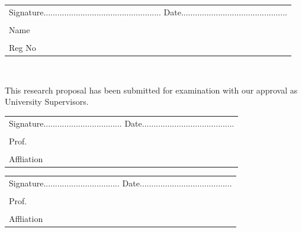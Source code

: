 \documentclass[12pt]{report}
\numberwithin{equation}{section}
\begin{document}
		\vspace{1cm}
		
		\indent %
		\begin{tabular}{l}
			Signature...................................................  Date..............................................\tabularnewline \\
			Name   \tabularnewline \\
			
			Reg No \tabularnewline
		\end{tabular}\\
		\vspace{1.2cm}
		
		
		\vspace{0.5cm}
		
		This research proposal has been submitted for examination with our approval as University Supervisors. \vspace{1.5cm}
		
		
		\noindent %
		\begin{tabular}{l}
			Signature..................................  Date........................................\tabularnewline \\
			Prof.   \tabularnewline \\
			\multicolumn{1}{l}{Affliation}\tabularnewline
		\end{tabular}
		
		\noindent \vspace{1.5cm}
		
		\begin{tabular}{l}
			Signature.................................  Date........................................\tabularnewline \\
			Prof.   \tabularnewline \\
			\multicolumn{1}{l}{Affliation}\tabularnewline
		\end{tabular}
		\textbf{\pagebreak{}}
		
\end{document}
